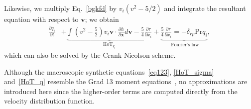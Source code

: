 \documentclass[onefignum,onetabnum]{siamart171218}
\begin{document}
Likewise, we multiply Eq.~\eqref{bgkfd} by $v_i(v^2-5/2)$ and integrate the resultant equation with respect to $\bm{v}$; we obtain 
\begin{equation}\label{HoT_q}
\begin{aligned}
\frac{\partial q_{i}}{\partial {t}}
&+\underbrace{ \int{\left(v^2-\frac{5}{2}\right)}v_i \bm{v}\cdot\frac{\partial h}{\partial \bm{x}}d\bm{v}
	-\frac{5}{4}\frac{\partial{\tau}}{\partial {x_{i}}
} }_{\text{HoT}_{q_i}} 
+\underbrace{\frac{5}{4}\frac{\partial{\tau}}{\partial {x_{i}}}=-\delta_{rp}\text{Pr}q_{i}}_{\text{ Fourier's law}},
\end{aligned}
\end{equation}
which can also be solved by the Crank-Nicolson scheme.



Although the macroscopic synthetic equations~\eqref{eq123}, \eqref{HoT_sigma} and~\eqref{HoT_q} resemble the Grad 13 moment equations~\cite{Grad1949,henning}, no approximations are introduced here since the higher-order terms are computed directly from the velocity distribution function. 




\end{document}
